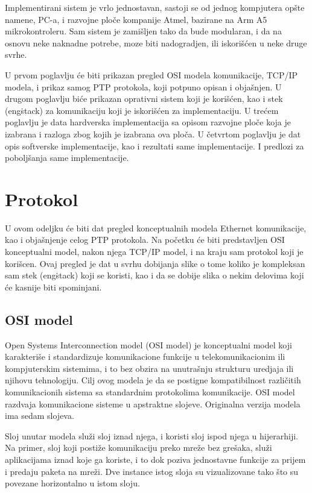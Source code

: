 \documentclass[a4paper,12pt, master]{etf}
\begin{document}
	Implementirani sistem je vrlo jednostavan, sastoji se od jednog kompjutera
	op\v{s}te namene, PC-a, i razvojne plo\v{c}e kompanije Atmel, bazirane na
	Arm A5 mikrokontroleru. Sam sistem je zami\v{s}ljen tako da bude modularan,
	i da na osnovu neke naknadne potrebe, moze biti nadogradjen, ili
	iskori\v{s}\'{c}en u neke druge svrhe.

	U prvom poglavlju \'{c}e biti prikazan pregled OSI modela komunikacije,
	TCP/IP modela, i prikaz samog PTP protokola, koji potpuno opisan i
	obja\v{s}njen. U drugom poglavlju bi\'{c}e prikazan oprativni sistem koji
	je kori\v{s}\'{c}en, kao i stek (eng\. stack) za komunikaciju koji je
	iskori\v{s}\'{c}en za implementaciju. U tre\'{c}em poglavlju je data
	hardverska implementacija sa opisom razvojne plo\v{c}e koja je izabrana i
	razloga zbog kojih je izabrana ova plo\v{c}a. U \v{c}etvrtom poglavlju je
	dat opis softverske implementacije, kao i rezultati same implementacije. I
	predlozi za pobolj\v{s}anja same implementacije.

	\newpage

	\chapter{Protokol}

	U ovom odeljku \'{c}e biti dat pregled konceptualnih modela Ethernet
	komunikacije, kao i obja\v{s}njenje	celog PTP protokola. Na po\v{c}etku
	\'{c}e biti predstavljen OSI konceptualni model, nakon njega TCP/IP	model,
	i na kraju sam protokol koji je kori\v{s}cen. Ovaj pregled je dat u svrhu
	dobijanja slike o tome koliko je kompleksan sam stek (eng\. stack) koji se
    koristi, kao i da se dobije slika o nekim delovima koji \'{c}e kasnije biti
    spominjani.

	\section{OSI model}

	Open Systems Interconnection model (OSI model) je konceptualni model koji
	karakteri\v{s}e i standardizuje komunikacione funkcije u telekomunikacionim
	ili kompjuterskim sistemima, i to bez obzira na unutra\v{s}nju strukturu
	uredjaja ili njihovu tehnologiju. Cilj ovog modela je da se postigne
	kompatibilnost razli\v{c}itih komunikacionih sistema sa standardnim
	protokolima komunikacije. OSI model razdvaja komunikacione sisteme u
	apstraktne slojeve.	Originalna verzija modela ima sedam slojeva.

	Sloj unutar modela slu\v{z}i sloj iznad njega, i koristi sloj ispod njega u
	hijerarhiji. Na	primer, sloj koji posti\v{z}e komunikaciju preko mre\v{z}e
	bez gre\v{s}aka, slu\v{z}i aplikacijama iznad koje ga koriste, i to dok
	poziva jednostavne funkcije za prijem i predaju paketa na mre\v{z}i.
	Dve instance istog sloja su vizualizovane tako \v{s}to su povezane
	horizontalno u istom sloju.
\end{document}
